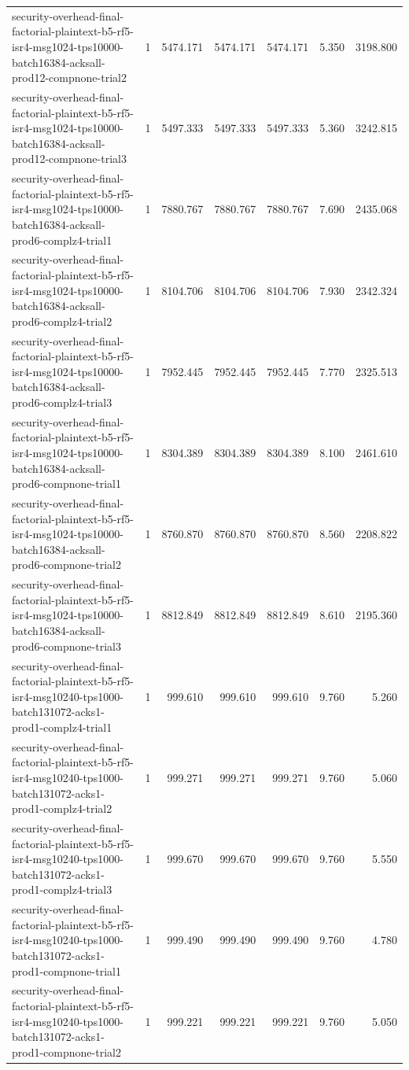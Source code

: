 \begin{tabular}{lrrrrrr}
security-overhead-final-factorial-plaintext-b5-rf5-isr4-msg1024-tps10000-batch16384-acksall-prod12-compnone-trial2 & 1 & 5474.171 & 5474.171 & 5474.171 & 5.350 & 3198.800 \\
security-overhead-final-factorial-plaintext-b5-rf5-isr4-msg1024-tps10000-batch16384-acksall-prod12-compnone-trial3 & 1 & 5497.333 & 5497.333 & 5497.333 & 5.360 & 3242.815 \\
security-overhead-final-factorial-plaintext-b5-rf5-isr4-msg1024-tps10000-batch16384-acksall-prod6-complz4-trial1 & 1 & 7880.767 & 7880.767 & 7880.767 & 7.690 & 2435.068 \\
security-overhead-final-factorial-plaintext-b5-rf5-isr4-msg1024-tps10000-batch16384-acksall-prod6-complz4-trial2 & 1 & 8104.706 & 8104.706 & 8104.706 & 7.930 & 2342.324 \\
security-overhead-final-factorial-plaintext-b5-rf5-isr4-msg1024-tps10000-batch16384-acksall-prod6-complz4-trial3 & 1 & 7952.445 & 7952.445 & 7952.445 & 7.770 & 2325.513 \\
security-overhead-final-factorial-plaintext-b5-rf5-isr4-msg1024-tps10000-batch16384-acksall-prod6-compnone-trial1 & 1 & 8304.389 & 8304.389 & 8304.389 & 8.100 & 2461.610 \\
security-overhead-final-factorial-plaintext-b5-rf5-isr4-msg1024-tps10000-batch16384-acksall-prod6-compnone-trial2 & 1 & 8760.870 & 8760.870 & 8760.870 & 8.560 & 2208.822 \\
security-overhead-final-factorial-plaintext-b5-rf5-isr4-msg1024-tps10000-batch16384-acksall-prod6-compnone-trial3 & 1 & 8812.849 & 8812.849 & 8812.849 & 8.610 & 2195.360 \\
security-overhead-final-factorial-plaintext-b5-rf5-isr4-msg10240-tps1000-batch131072-acks1-prod1-complz4-trial1 & 1 & 999.610 & 999.610 & 999.610 & 9.760 & 5.260 \\
security-overhead-final-factorial-plaintext-b5-rf5-isr4-msg10240-tps1000-batch131072-acks1-prod1-complz4-trial2 & 1 & 999.271 & 999.271 & 999.271 & 9.760 & 5.060 \\
security-overhead-final-factorial-plaintext-b5-rf5-isr4-msg10240-tps1000-batch131072-acks1-prod1-complz4-trial3 & 1 & 999.670 & 999.670 & 999.670 & 9.760 & 5.550 \\
security-overhead-final-factorial-plaintext-b5-rf5-isr4-msg10240-tps1000-batch131072-acks1-prod1-compnone-trial1 & 1 & 999.490 & 999.490 & 999.490 & 9.760 & 4.780 \\
security-overhead-final-factorial-plaintext-b5-rf5-isr4-msg10240-tps1000-batch131072-acks1-prod1-compnone-trial2 & 1 & 999.221 & 999.221 & 999.221 & 9.760 & 5.050 \\

\end{tabular}

